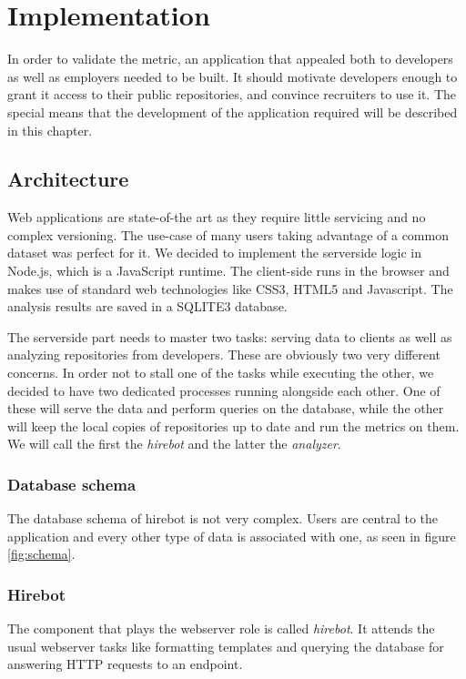 \chapter{Implementation}\label{ch:implementation}
In order to validate the metric,
an application that appealed both to developers as well as employers
needed to be built. It should motivate developers enough to grant it access to their
public repositories, and convince recruiters to use it. The special means that
the development of the application required will be described in this chapter.

\section{Architecture}
Web applications are state-of-the art as they require little servicing
and no complex versioning. The use-case of many users taking
advantage of a common dataset was perfect for it.
We decided to implement the serverside logic in Node.js, which is a
JavaScript runtime. The client-side runs in the browser and makes
use of standard web technologies like CSS3, HTML5 and Javascript.
The analysis results are saved in a SQLITE3 database.
\newline

The serverside part needs to master two tasks: serving data to clients
as well as analyzing repositories from developers.
These are obviously two very different concerns.
In order not to stall one of the tasks while executing the other,
we decided to have two dedicated processes running alongside each other.
One of these will serve the data and perform queries on the database,
while the other will keep the local copies of repositories up to date and run
the metrics on them. We will call the first the \textit{hirebot} and the
latter the \textit{analyzer}.

\subsection{Database schema}
The database schema of hirebot is not very complex.
Users are central to the application and every other type of data
is associated with one, as seen in figure \ref{fig:schema}.

\subsection{Hirebot}
The component that plays the webserver role is called \textit{hirebot}.
It attends the usual webserver tasks like formatting templates and querying
the database for answering HTTP requests to an endpoint.
\newline

